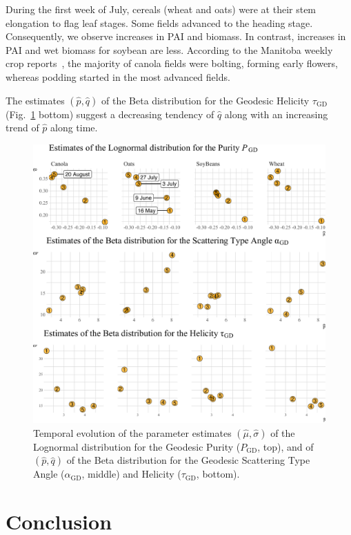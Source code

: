 \documentclass[journal]{IEEEtran}
\begin{document}
{During the first week of July, cereals (wheat and oats) were at their stem elongation to flag leaf stages. Some fields advanced to the heading stage. Consequently, we observe increases in PAI and biomass. 
In contrast, increases in PAI and wet biomass for soybean are less. According to the Manitoba weekly crop reports~\cite{manitobaagriculture}, the majority of canola fields were bolting, forming early flowers, whereas podding started in the most advanced fields.

The estimates $(\widehat p, \widehat q)$ of the Beta distribution for the Geodesic Helicity $\tau_{\text{GD}}$ (Fig.~\ref{fig:TemporalIndexes} bottom) suggest a decreasing tendency of $\widehat q$ along with an increasing trend of $\widehat p$ along time.

\begin{figure}
	\centering
	\includegraphics[width=\columnwidth]{TemporalIndexes}
	\caption{Temporal evolution of the parameter estimates $(\widehat\mu,\widehat\sigma)$ of the Lognormal distribution for the Geodesic Purity ($P_{\text{GD}}$, top), and of $(\widehat p,\widehat q)$ of the Beta distribution for the Geodesic Scattering Type Angle ($\alpha_{\text{GD}}$, middle) and Helicity ($\tau_{\text{GD}}$, bottom).}\label{fig:TemporalIndexes}
\end{figure}

\section{Conclusion}

}
\end{document}
